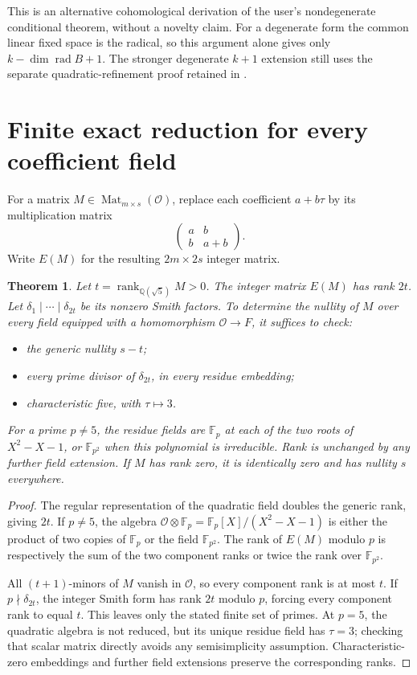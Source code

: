 \documentclass[11pt]{article}
\newtheorem{theorem}{Theorem}
\newcommand{\F}{\mathbb F}
\newcommand{\rk}{\operatorname{rank}}
\newcommand{\OO}{\mathcal O}
\begin{document}
This is an alternative cohomological derivation of the user's
nondegenerate conditional theorem, without a novelty claim. For a
degenerate form the common linear fixed space is the radical, so
this argument alone gives only $k-\dim\operatorname{rad}B+1$.
The stronger degenerate $k+1$ extension still uses the separate
quadratic-refinement proof retained in .

\section{Finite exact reduction for every coefficient field}

For a matrix $M\in\operatorname{Mat}_{m\times s}(\OO)$, replace each
coefficient $a+b\tau$ by its multiplication matrix
\[
                    \begin{pmatrix}a&b\\b&a+b\end{pmatrix}.
\]
Write $E(M)$ for the resulting $2m\times2s$ integer matrix.

\begin{theorem}\label{thm:quadratic}
Let $t=\rk_{\mathbb Q(\sqrt5)}M>0$. The integer matrix $E(M)$ has
rank $2t$. Let $\delta_1\mid\cdots\mid\delta_{2t}$ be its nonzero
Smith factors. To determine the nullity of $M$ over every field
equipped with a homomorphism $\OO\to F$, it suffices to check:
\begin{itemize}
\item the generic nullity $s-t$;
\item every prime divisor of $\delta_{2t}$, in every residue embedding;
\item characteristic five, with $\tau\mapsto3$.
\end{itemize}
For a prime $p\ne5$, the residue fields are $\F_p$ at each of the two
roots of $X^2-X-1$, or $\F_{p^2}$ when this polynomial is irreducible.
Rank is unchanged by any further field extension. If $M$ has rank
zero, it is identically zero and has nullity $s$ everywhere.
\end{theorem}
\begin{proof}
The regular representation of the quadratic field doubles the generic
rank, giving $2t$. If $p\ne5$, the algebra
$\OO\otimes\F_p=\F_p[X]/(X^2-X-1)$ is either the product of two
copies of $\F_p$ or the field $\F_{p^2}$. The rank of $E(M)$ modulo
$p$ is respectively the sum of the two component ranks or twice the
rank over $\F_{p^2}$.

All $(t+1)$-minors of $M$ vanish in $\OO$, so every component rank is
at most $t$. If $p\nmid\delta_{2t}$, the integer Smith form has rank
$2t$ modulo $p$, forcing every component rank to equal $t$. This
leaves only the stated finite set of primes. At $p=5$, the quadratic
algebra is not reduced, but its unique residue field has $\tau=3$;
checking that scalar matrix directly avoids any semisimplicity
assumption. Characteristic-zero embeddings and further field
extensions preserve the corresponding ranks.
\end{proof}
\end{document}
